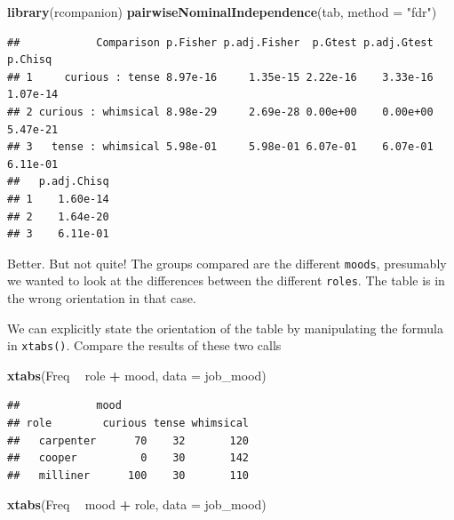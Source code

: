 \documentclass[
]{book}
\newenvironment{Shaded}{\begin{snugshade}}{\end{snugshade}}
\newcommand{\DataTypeTok}[1]{\textcolor[rgb]{0.13,0.29,0.53}{#1}}
\newcommand{\KeywordTok}[1]{\textcolor[rgb]{0.13,0.29,0.53}{\textbf{#1}}}
\newcommand{\NormalTok}[1]{#1}
\newcommand{\OperatorTok}[1]{\textcolor[rgb]{0.81,0.36,0.00}{\textbf{#1}}}
\newcommand{\StringTok}[1]{\textcolor[rgb]{0.31,0.60,0.02}{#1}}
\begin{document}
\begin{Shaded}
\begin{Highlighting}[]
\KeywordTok{library}\NormalTok{(rcompanion)}
\KeywordTok{pairwiseNominalIndependence}\NormalTok{(tab, }\DataTypeTok{method =} \StringTok{"fdr"}\NormalTok{)}
\end{Highlighting}
\end{Shaded}

\begin{verbatim}
##            Comparison p.Fisher p.adj.Fisher  p.Gtest p.adj.Gtest  p.Chisq
## 1     curious : tense 8.97e-16     1.35e-15 2.22e-16    3.33e-16 1.07e-14
## 2 curious : whimsical 8.98e-29     2.69e-28 0.00e+00    0.00e+00 5.47e-21
## 3   tense : whimsical 5.98e-01     5.98e-01 6.07e-01    6.07e-01 6.11e-01
##   p.adj.Chisq
## 1    1.60e-14
## 2    1.64e-20
## 3    6.11e-01
\end{verbatim}

Better. But not quite! The groups compared are the different \texttt{moods}, presumably we wanted to look at the differences between the different \texttt{roles}. The table is in the wrong orientation in that case.

We can explicitly state the orientation of the table by manipulating the formula in \texttt{xtabs()}. Compare the results of these two calls

\begin{Shaded}
\begin{Highlighting}[]
\KeywordTok{xtabs}\NormalTok{(Freq }\OperatorTok{~}\StringTok{ }\NormalTok{role }\OperatorTok{+}\StringTok{ }\NormalTok{mood, }\DataTypeTok{data =}\NormalTok{ job_mood)}
\end{Highlighting}
\end{Shaded}

\begin{verbatim}
##            mood
## role        curious tense whimsical
##   carpenter      70    32       120
##   cooper          0    30       142
##   milliner      100    30       110
\end{verbatim}

\begin{Shaded}
\begin{Highlighting}[]
\KeywordTok{xtabs}\NormalTok{(Freq }\OperatorTok{~}\StringTok{ }\NormalTok{mood }\OperatorTok{+}\StringTok{ }\NormalTok{role, }\DataTypeTok{data =}\NormalTok{ job_mood)}
\end{Highlighting}
\end{Shaded}
\end{document}

